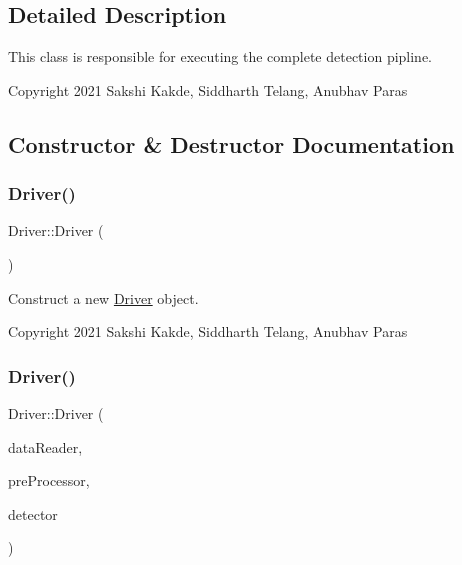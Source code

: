 \subsection{Detailed Description}
This class is responsible for executing the complete detection pipline. 

Copyright 2021 Sakshi Kakde, Siddharth Telang, Anubhav Paras 

\subsection{Constructor \& Destructor Documentation}
\mbox{\label{classDriver_af0658d103e3e810a8e9ef0a53bb2e261}} 
\subsubsection{\texorpdfstring{Driver()}{Driver()}\hspace{0.1cm}{\footnotesize\ttfamily [1/2]}}
{\footnotesize\ttfamily Driver\+::\+Driver (\begin{DoxyParamCaption}{ }\end{DoxyParamCaption})}



Construct a new \hyperlink{classDriver}{Driver} object. 

Copyright 2021 Sakshi Kakde, Siddharth Telang, Anubhav Paras \mbox{\label{classDriver_a6c9f75abe2410437cd3a0091d2ed41b3}} 
\subsubsection{\texorpdfstring{Driver()}{Driver()}\hspace{0.1cm}{\footnotesize\ttfamily [2/2]}}
{\footnotesize\ttfamily Driver\+::\+Driver (\begin{DoxyParamCaption}\item[{std\+::unique\+\_\+ptr$<$ \hyperlink{classDataReader}{Data\+Reader}$<$ cv\+::\+Mat $>$$>$}]{data\+Reader,  }\item[{std\+::unique\+\_\+ptr$<$ \hyperlink{classPreProcessor}{Pre\+Processor} $>$}]{pre\+Processor,  }\item[{std\+::unique\+\_\+ptr$<$ \hyperlink{classDetector}{Detector} $>$}]{detector }\end{DoxyParamCaption})}



